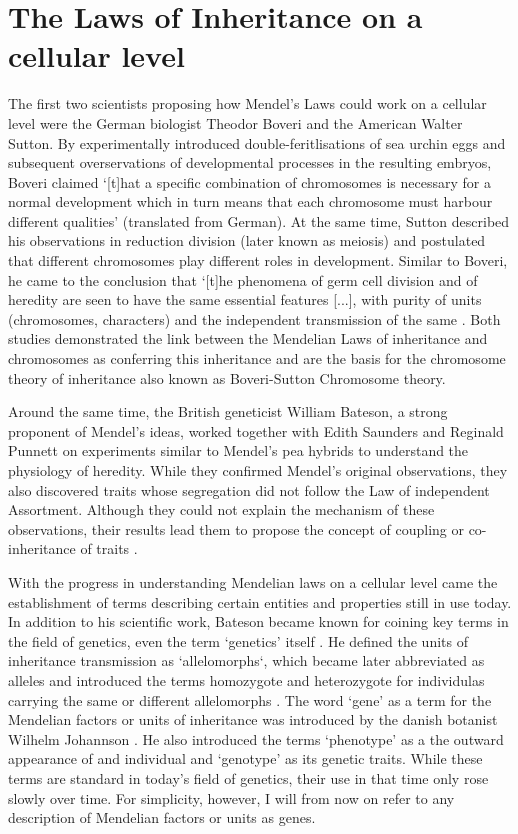 \section{The Laws of Inheritance on a cellular level}
The first two scientists proposing how Mendel's Laws could work on a cellular level were the German biologist Theodor Boveri and the American Walter Sutton. By experimentally introduced double-feritlisations of sea urchin eggs and subsequent overservations of developmental processes in the resulting embryos, Boveri claimed `[t]hat a specific combination of chromosomes is necessary for a normal development which in turn means that each chromosome must harbour different qualities' (translated from German). At the same time, Sutton described his observations in reduction division (later known as meiosis) and postulated that different chromosomes play different roles in development. Similar to Boveri, he came to the conclusion that `[t]he phenomena of germ cell division and of heredity are seen to have the same essential features [...], with purity of units (chromosomes, characters) and the independent transmission of the same \citep{Sutton1903}. Both studies demonstrated the link between the Mendelian Laws of inheritance and chromosomes as conferring this inheritance and are the basis for the chromosome theory of inheritance also known as Boveri-Sutton Chromosome theory. 

Around the same time, the British geneticist William Bateson, a strong proponent of Mendel's ideas, worked together with Edith Saunders and Reginald Punnett on experiments similar to Mendel's pea hybrids to understand the physiology of heredity. While they confirmed Mendel's original observations, they also discovered traits whose segregation did not follow the Law of independent Assortment. Although they could not explain the mechanism of these observations, their results lead them to propose the concept of coupling or co-inheritance of traits \citep{Bateson1905}. 

With the progress in understanding Mendelian laws on a cellular level came the establishment of terms describing certain entities and properties still in use today. In addition to his scientific work, Bateson became known for coining key terms in the field of genetics, even the term `genetics' itself \citep{Dunwell2007}. He defined the units of inheritance transmission as `allelomorphs`, which became later abbreviated as alleles and introduced the terms homozygote and heterozygote for individulas carrying the same or different allelomorphs \citep{Bateson1902}. The word `gene' as a term for the Mendelian factors or units of inheritance was introduced by the danish botanist Wilhelm Johannson \citep{Johannsen1911}. He also introduced the terms `phenotype' as a the outward appearance of and individual and `genotype' as its genetic traits. While these terms are standard in today's field of genetics, their use in that time only rose slowly over time. For simplicity, however, I will from now on refer to any description of Mendelian factors or units as genes. 

